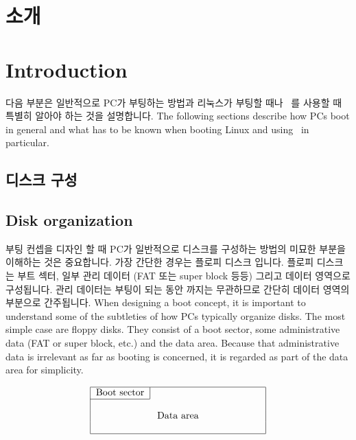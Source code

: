 \newpage
\section{소개}
\section{Introduction}

다음 부분은 일반적으로 PC가 부팅하는 방법과 리눅스가 부팅할 때나 \LILO\ 를 사용할 때 특별히 알아야 하는 것을 설명합니다.
The following sections describe how PCs
boot in general and what has to be known when booting Linux and using
\LILO\ in particular.

\subsection{디스크 구성}
\subsection{Disk organization}
\label{diskorg}

부팅 컨셉을 디자인 할 때 PC가 일반적으로 디스크를 구성하는 방법의 미묘한 부분을 이해하는 것은 중요합니다. 가장 간단한 경우는 플로피 디스크 입니다. 플로피 디스크는 부트 섹터, 일부 관리 데이터 (FAT 또는 super block 등등) 그리고 데이터 영역으로 구성됩니다. 관리 데이터는 부팅이 되는 동안 까지는 무관하므로 간단히 데이터 영역의 부분으로 간주됩니다.
When designing a boot concept, it is important to understand some of the
subtleties of how PCs typically organize disks. The most simple case are
floppy disks. They consist of a boot sector, some administrative
data (FAT or super block, etc.) and the data area. Because that
administrative data is irrelevant as far as booting is concerned, it is
regarded as part of the data area for simplicity.

$$
\begin{tabular}{|c|c|}
  \hline
  Boot sector & \hbox to 1.5in{\hfil} \\
  \cline{1-1}
  \multicolumn{2}{|c|}{} \\
  \multicolumn{2}{|c|}{Data area} \\
  \multicolumn{2}{|c|}{} \\
  \hline
  \end{tabular}
$$

